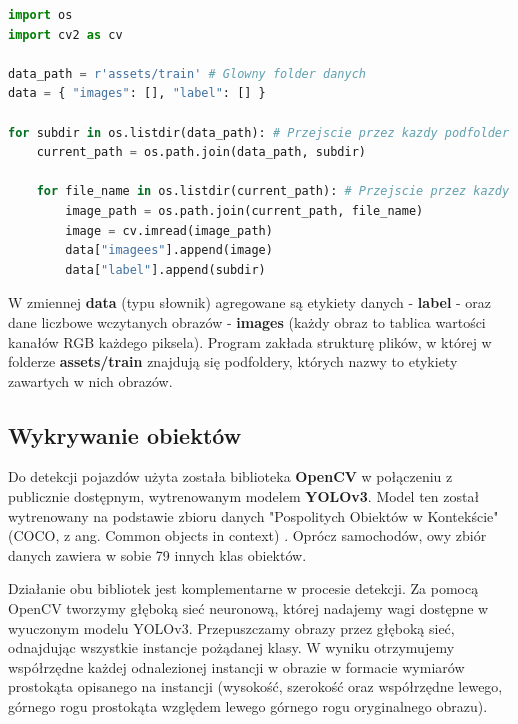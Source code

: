 \begin{lstlisting}[language=Python, caption=Wczytanie zbioru danych]
import os
import cv2 as cv

data_path = r'assets/train' # Glowny folder danych
data = { "images": [], "label": [] }

for subdir in os.listdir(data_path): # Przejscie przez kazdy podfolder
    current_path = os.path.join(data_path, subdir)

    for file_name in os.listdir(current_path): # Przejscie przez kazdy plik w podfolderze
        image_path = os.path.join(current_path, file_name)
        image = cv.imread(image_path)
        data["imagees"].append(image)
        data["label"].append(subdir)
\end{lstlisting}

W zmiennej \textbf{data} (typu słownik) agregowane są etykiety danych - \textbf{label} - oraz dane liczbowe wczytanych obrazów - \textbf{images} (każdy obraz to tablica wartości kanałów RGB każdego piksela). Program zakłada strukturę plików, w której w folderze \textbf{assets/train} znajdują się podfoldery, których nazwy to etykiety zawartych w nich obrazów.

\subsection{Wykrywanie obiektów}
Do detekcji pojazdów użyta została biblioteka \textbf{OpenCV} w połączeniu z publicznie dostępnym, wytrenowanym modelem \textbf{YOLOv3}. Model ten został wytrenowany na podstawie zbioru danych "\null{}Pospolitych Obiektów w Kontekście" (COCO, z ang. Common objects in context) \cite{coco}. Oprócz samochodów, owy zbiór danych zawiera w sobie 79 innych klas obiektów.

Działanie obu bibliotek jest komplementarne w procesie detekcji. Za pomocą OpenCV tworzymy głęboką sieć neuronową, której nadajemy wagi dostępne w wyuczonym modelu YOLOv3. Przepuszczamy obrazy przez głęboką sieć, odnajdując wszystkie instancje pożądanej klasy. W wyniku otrzymujemy współrzędne każdej odnalezionej instancji w obrazie w formacie wymiarów prostokąta opisanego na instancji (wysokość, szerokość oraz współrzędne lewego, górnego rogu prostokąta względem lewego górnego rogu oryginalnego obrazu).\\

